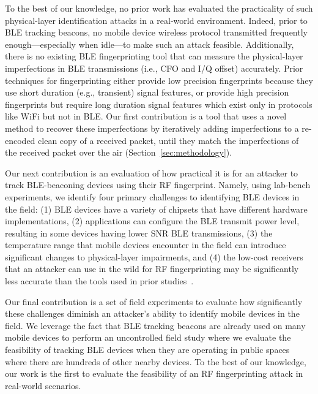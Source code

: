 To the best of our knowledge, no prior work has evaluated the
practicality of such physical-layer identification attacks in a real-world
environment. Indeed, prior to BLE tracking beacons, no mobile device wireless
protocol transmitted frequently enough---especially when idle---to make
such an attack feasible. Additionally, there is no existing BLE fingerprinting tool that can measure 
the physical-layer imperfections in BLE transmissions (i.e., CFO and I/Q offset) accurately.  
%
Prior techniques for fingerprinting either provide low precision fingerprints because they use short duration (e.g., transient) signal features, or provide high precision fingerprints but require long duration signal features which exist only in protocols like WiFi but not in BLE.
%
Our first
contribution is a tool that uses a novel method to recover these imperfections by iteratively adding imperfections to a re-encoded clean copy of a received packet,
until they match the imperfections of the received packet over the air (Section~\ref{sec:methodology}).

Our next contribution is an evaluation of how practical it is for an attacker to
track BLE-beaconing devices using their RF fingerprint. Namely, using lab-bench
experiments, we identify four primary challenges to identifying BLE devices in
the field: (1) BLE devices have a variety of chipsets that have different
hardware implementations, (2) applications can configure the BLE transmit
power level, resulting in some devices having lower SNR BLE transmissions,
(3) the temperature range that mobile devices encounter in the field
can introduce significant changes to physical-layer impairments, and (4) the low-cost
receivers that an attacker can use in the wild for RF fingerprinting may be significantly less accurate than the tools used in prior studies~\cite{Brik_radiometric}.
 
Our final contribution is a set of field experiments to evaluate how
significantly these challenges diminish an attacker's ability to identify
mobile devices in the field. We leverage the fact that BLE tracking beacons are
already used on many mobile devices to perform an uncontrolled field study
where we evaluate the feasibility of tracking BLE devices when they
are operating in public spaces where there are hundreds of other nearby devices.
 To the best of our knowledge, our work is
the first to evaluate the feasibility of an RF fingerprinting attack in
real-world scenarios.

